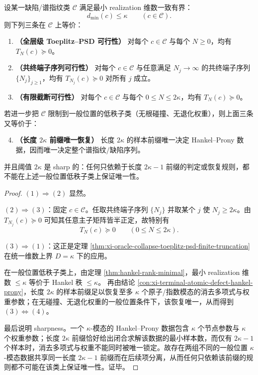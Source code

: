 \begin{theorem}\label{thm:xi-low-rank-horizon-certificate-2kappa-sharp}
设某一缺陷/谱指纹类 \(\mathscr C\) 满足最小 realization 维数一致有界：
\[
d_{\min}(c)\le \kappa
\qquad(c\in\mathscr C).
\]
则下列三条在 \(\mathscr C\) 上等价：
\begin{enumerate}
  \item \textbf{（全层级 Toeplitz--PSD 可行性）}
  对每个 \(c\in\mathscr C\) 与每个 \(N\ge 0\)，均有 \(T_N(c)\succeq 0\)。
  \item \textbf{（共终端子序列可行性）}
  对每个 \(c\in\mathscr C\) 与任意满足 \(N_j\to\infty\) 的共终端子序列 \(\{N_j\}_{j\ge 1}\)，均有 \(T_{N_j}(c)\succeq 0\) 对所有 \(j\) 成立。
  \item \textbf{（有限截断可行性）}
  对每个 \(c\in\mathscr C\) 与每个 \(0\le N\le 2\kappa\)，均有 \(T_N(c)\succeq 0\)。
\end{enumerate}
若进一步把 \(\mathscr C\) 限制到一般位置的低秩子类（无根碰撞、无退化权重），则上面三条又等价于：
\begin{enumerate}
  \setcounter{enumi}{3}
  \item \textbf{（长度 \texorpdfstring{$2\kappa$}{2kappa} 前缀唯一恢复）}
  长度 \(2\kappa\) 的样本前缀唯一决定 Hankel--Prony 数据，因而唯一决定整个谱指纹/缺陷序列。
\end{enumerate}
并且阈值 \(2\kappa\) 是 sharp 的：任何只依赖于长度 \(2\kappa-1\) 前缀的判定或恢复规则，都不能在上述一般位置低秩子类上保证唯一性。
\end{theorem}
\begin{proof}
\((1)\Rightarrow(2)\) 显然。

\((2)\Rightarrow(3)\)：固定 \(c\in\mathscr C\)。任取共终端子序列 \(\{N_j\}\) 并取某个 \(j\) 使 \(N_j\ge 2\kappa\)。由 \(T_{N_j}(c)\succeq 0\) 可知其任意主子矩阵皆半正定，故特别有
\[
T_N(c)\succeq 0
\qquad(0\le N\le 2\kappa).
\]

\((3)\Rightarrow(1)\)：这正是定理 \ref{thm:xi-oracle-collapse-toeplitz-psd-finite-truncation} 在统一维数上界 \(D=\kappa\) 下的应用。

在一般位置低秩子类上，由定理 \ref{thm:hankel-rank-minimal}，最小 realization 维数 \(\le\kappa\) 等价于 Hankel 秩 \(\le\kappa\)。
再由结论 \ref{con:xi-terminal-atomic-defect-hankel-prony}，长度 \(2\kappa\) 的样本前缀足以恢复至多 \(\kappa\) 个原子/指数模态的消去多项式与权重参数；在无碰撞、无退化权重的一般位置条件下，该恢复唯一，从而得到 \((3)\Leftrightarrow(4)\)。

最后说明 sharpness。一个 \(\kappa\)-模态的 Hankel--Prony 数据包含 \(\kappa\) 个节点参数与 \(\kappa\) 个权重参数；长度 \(2\kappa\) 前缀恰好给出闭合求解该数据的最小样本数，而仅有 \(2\kappa-1\) 个样本时，消去多项式与权重不能同时被唯一锁定。故存在两组不同的一般位置 \(\kappa\)-模态数据共享同一长度 \(2\kappa-1\) 前缀而在后续项分离，从而任何只依赖该前缀的规则都不可能在该类上保证唯一性。证毕。
\end{proof}

